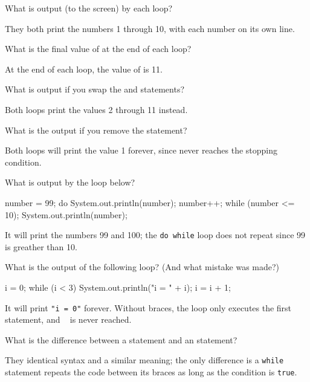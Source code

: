 \Q \label{output}
What is output (to the screen) by each loop?

\begin{answer}
They both print the numbers 1 through 10, with each number on its own line.
\end{answer}


\Q \label{value}
What is the final value of  at the end of each loop?

\begin{answer}
At the end of each loop, the value of  is 11.
\end{answer}


\Q What is output if you swap the  and  statements?

\begin{answer}
Both loops print the values 2 through 11 instead.
\end{answer}


\Q What is the output if you remove the  statement?

\begin{answer}
Both loops will print the value 1 forever, since  never reaches the stopping condition.
\end{answer}


\Q \label{do99}
What is output by the loop below?

\begin{minipage}{0.49\textwidth}
\begin{javalst}
    number = 99;
    do {
        System.out.println(number);
        number++;
    } while (number <= 10);
    System.out.println(number);
\end{javalst}
\end{minipage}
\hfill
\begin{minipage}{0.49\textwidth}
\begin{answer}[5em]
It will print the numbers 99 and 100; the \texttt{do while} loop does not repeat since 99 is greather than 10.
\end{answer}
\end{minipage}
\vspace{1ex}


\Q What is the output of the following loop? (And what mistake was made?)

\begin{minipage}{0.49\textwidth}
\begin{javalst}
    i = 0;
    while (i < 3) 
        System.out.println("i = " + i);
        i = i + 1;
\end{javalst}
\end{minipage}
\hfill
\begin{minipage}{0.49\textwidth}
\begin{answer}
It will print \texttt{"i = 0"} forever. Without braces, the loop only executes the first statement, and ~ is never reached.
\end{answer}
\end{minipage}
\vspace{1ex}


\Q What is the difference between a  statement and an  statement?

\begin{answer}
They identical syntax and a similar meaning; the only difference is a \texttt{while} statement repeats the code between its braces as long as the condition is \texttt{true}.
\end{answer}
